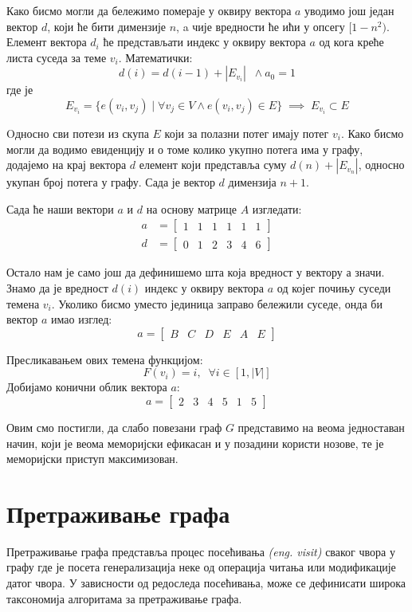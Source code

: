\par Како бисмо могли да бележимо помераје у оквиру вектора $a$ уводимо још један вектор $d$, који ће бити димензије $n$, a чије вредности ће ићи у опсегу $[1-n^2)$. Елемент вектора $d_{i}$ ће представљати индекс у оквиру вектора $a$ од кога креће листа суседа за теме $v_i$. Математички:
$$d(i) = d(i - 1) + |E_{v_i}| \;\; \land a_0=1$$
где је
$$E_{v_i} = \{e(v_i, v_j) \; | \; \forall v_j \in V \land e(v_i, v_j) \in E\} \; \implies \; E_{v_i}\subset E$$

Oдносно сви потези из скупа $E$ који за полазни потег имају потег $v_i$. Како бисмо могли да водимо евиденцију и о томе колико укупно потега има у графу, додајемо на крај вектора $d$ елемент који представља суму $d(n) + |E_{v_n}|$, односно укупан број потега у графу. Сада је вектор $d$ димензија $n + 1$.

\par
Сада ће наши вектори $a$ и $d$ на основу матрице $A$ изгледати:
\[
\begin{split}
a &= 
\begin{bmatrix}
    1 & 1 & 1 & 1 & 1 & 1
\end{bmatrix}\\
d &=
\begin{bmatrix}
    0 & 1 & 2 & 3 & 4 & 6
\end{bmatrix}
\end{split}
\]
\par
Остало нам је само још да дефинишемо шта која вредност у вектору $а$ значи. Знамо да је вредност $d(i)$ индекс у оквиру вектора $a$ од којег почињу суседи темена $v_i$. Уколико бисмо уместо јединица заправо бележили суседе, онда би вектор $a$ имао изглед:
$$
a = 
\begin{bmatrix}
    B & C & D & E & A & E
\end{bmatrix}
$$
\par
Пресликавањем ових темена функцијом:
$$
F(v_i) = i, \; \; \forall i \in [1, \lvert V \rvert]
$$
Добијамо конични облик вектора $a$:
$$
a = 
\begin{bmatrix}
    2 & 3 & 4 & 5 & 1 & 5
\end{bmatrix}
$$
\par
Овим смо постигли, да слабо повезани граф $G$ представимо на веома једноставан начин, који је веома меморијски ефикасан и у позадини користи нозове, те је меморијски приступ максимизован.

\section{Претраживање графа}
Претраживање графа представља процес посећивања \textit{(eng. visit)} сваког чвора у графу где је посета генерализација неке од операција читања или модификације датог чвора. У зависности од редоследа посећивања, може се дефинисати широка таксономија алгоритама за претраживање графа.

